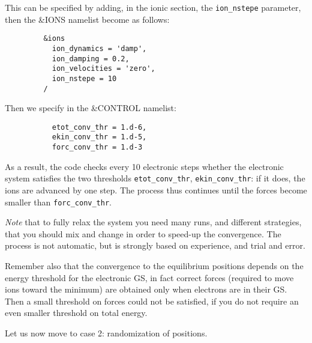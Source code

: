 \documentclass[12pt,a4paper]{article}
\begin{document}
\begin{itemize}
This can be specified by adding, in the ionic section, the 
\texttt{ion\_nstepe}
parameter, then the \&IONS namelist become as follows:
\begin{verbatim} 
         &ions
           ion_dynamics = 'damp',
           ion_damping = 0.2,
           ion_velocities = 'zero',
           ion_nstepe = 10
         /
\end{verbatim}
Then we specify in the \&CONTROL namelist:
\begin{verbatim} 
           etot_conv_thr = 1.d-6,
           ekin_conv_thr = 1.d-5,
           forc_conv_thr = 1.d-3
\end{verbatim}
As a result, the code checks every 10 electronic steps whether
the electronic system satisfies the two thresholds 
\texttt{etot\_conv\_thr}, \texttt{ekin\_conv\_thr}: if it does, 
the ions are advanced by one step.
The process thus continues until the forces become smaller than
\texttt{forc\_conv\_thr}.

{\em Note} that to fully relax the system you need many runs, and different 
strategies, that you should mix and change in order to speed-up the convergence.
The process is not automatic, but is strongly based on experience, and trial 
and error.

Remember also that the convergence to the equilibrium positions depends on 
the energy threshold for the electronic GS, in fact correct forces (required
to move ions toward the minimum) are obtained only when electrons are in their 
GS. Then a small threshold on forces could not be satisfied, if you do not 
require an even smaller threshold on total energy.
\end{itemize}

Let us now move to case 2: randomization of positions.
   
\end{document}
